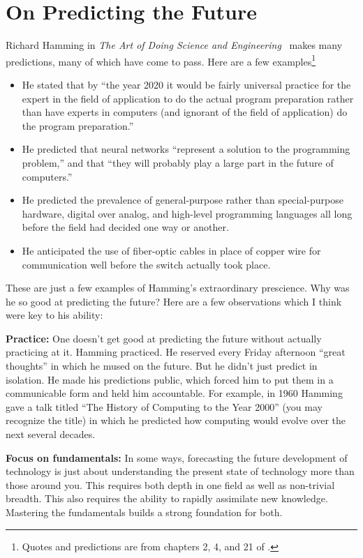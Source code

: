 \section{On Predicting the Future}
\label{sec:predicting_future}

Richard Hamming in \emph{The Art of
Doing Science and Engineering}~\citep{hamming1997art} makes many predictions,
many of which have come to pass. Here are a few examples\footnote{Quotes and
predictions are from chapters 2, 4, and 21 of \citet{hamming1997art}.}
\begin{itemize}
    \item He stated that by ``the year 2020 it would be fairly universal
        practice for the expert in the field of application to do the actual
        program preparation rather than have experts in computers (and ignorant
        of the field of application) do the program preparation.''
    \item He predicted that neural networks ``represent a solution to the
        programming problem,'' and that ``they will probably play a large part
        in the future of computers.''
    \item He predicted the prevalence of general-purpose rather than
        special-purpose hardware, digital over analog, and high-level
        programming languages all long before the field had decided one way or
        another.
    \item He anticipated the use of fiber-optic cables in place of copper wire
        for communication well before the switch actually took place.
\end{itemize}

These are just a few examples of Hamming's extraordinary prescience. Why was he
so good at predicting the future? Here are a few observations which I think
were key to his ability:

{\bf Practice:} One doesn't get good at predicting the future without actually
practicing at it. Hamming practiced. He reserved every Friday afternoon ``great
thoughts'' in which he mused on the future. But he didn't just predict in
isolation. He made his predictions public, which forced him to put them in a
communicable form and held him accountable. For example, in 1960 Hamming gave a
talk titled ``The History of Computing to the Year 2000'' (you may recognize
the title) in which he predicted how computing would evolve over the next
several decades.

{\bf Focus on fundamentals:} In some ways, forecasting the future development
of technology is just about understanding the present state of technology more
than those around you. This requires both depth in one field as well as
non-trivial breadth. This also requires the ability to rapidly assimilate new
knowledge. Mastering the fundamentals builds a strong foundation for both.

